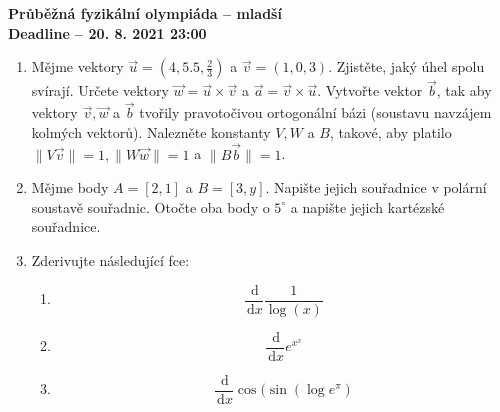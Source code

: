 \documentclass[a4paper, 12pt]{article}
\newcommand{\de}{\, \mathrm{d}}
\newcommand{\dx}{\, \mathrm{d}x}
\begin{document}
\begin{center}
\textbf{{\large
Průběžná fyzikální olympiáda -- mladší\\
Deadline -- 20. 8. 2021 23:00
}}

\end{center}


\begin{enumerate} [1)]
\item\relax[5 bodů] Mějme vektory $\Vec{u}= (4, 5.5, \frac{2}{3})$ a $\Vec{v}=(1,0,3)$. Zjistěte, jaký úhel spolu svírají. Určete vektory $\Vec{w}=\Vec{u} \times \Vec{v}$ a $\Vec{a} = \Vec{v} \times \Vec{u}$. Vytvořte vektor $\Vec{b}$, tak aby vektory $\Vec{v}, \Vec{w}$ a $\Vec{b}$ tvořily pravotočivou ortogonální bázi (soustavu navzájem kolmých vektorů). Nalezněte konstanty $V, W$ a $B$, takové, aby platilo $\|V\Vec{v}\|=1, \|W\Vec{w}\|=1$ a $\|B\Vec{b}\|=1$.

\item\relax[3 body] Mějme body $A=[2,1]$ a $B=[3,y]$. Napište jejich souřadnice v polární soustavě souřadnic. Otočte oba body o $5^{\circ}$ a napište jejich kartézské souřadnice.

\item\relax[3 body] Zderivujte následující fce:
    \begin{enumerate}[1)]
         \item $$\frac{\de}{\dx} \frac{1}{\log (x)}$$
         \item $$\frac{\de}{\dx} e^{x^x} $$
         \item $$\frac{\de}{\dx} \cos(\sin(\log e^\pi) $$
    \end{enumerate}

\end{enumerate}
\end{document}
